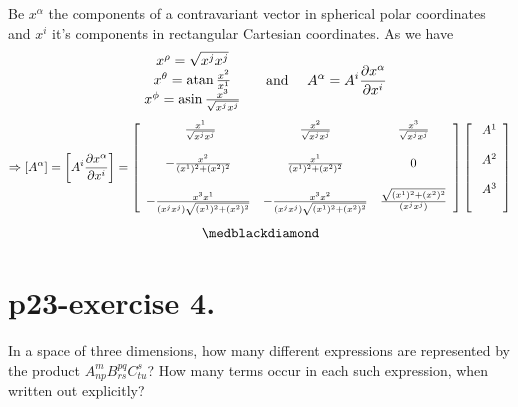 Be $x^{\alpha}$ the components of a contravariant vector in spherical polar coordinates and $x^{i}$ it's components in rectangular Cartesian coordinates. As we have  
\begin{align}
 \begin{array}{c}
    \ x^{\rho} = \sqrt{x^{j}x^{j}}\\
    \ x^{\theta} = \atan{\frac{x^{2}}{x^{1}}}\\
    \ x^{\phi} = \asin{\frac{x^{3}}{\sqrt{{x^{j}x^{j}}}}}\\
  \end{array} \quad \text{ and } \quad A^{\alpha} = A^{i}\pdv{x^{\alpha}}{x^{i}}
  \end{align}
\begin{align}
\Rightarrow \left[A^{\alpha} \right]=  \left[A^{i}\pdv{x^{\alpha}}{x^{i}}\right] = \left[ {\begin{array}{ccc}
    \ \frac{x^1} { \sqrt{x^{j}x^{j}}} & \frac{x^2} { \sqrt{x^{j}x^{j}}} & \frac{x^3} { \sqrt{x^{j}x^{j}}}\\\\
    -\frac{x^2} { (x^1)^2+(x^2)^2} & \frac{x^1} { (x^1)^2+(x^2)^2}  & 0 \\\\
    -\frac{x^3x^1} { (x^{j}x^{j})\sqrt{(x^1)^2+(x^2)^2}} & -\frac{x^3x^2} { (x^{j}x^{j})\sqrt{(x^1)^2+(x^2)^2}}  & \frac{\sqrt{(x^1)^2+(x^2)^2}} { (x^{j}x^{j})} \\
  \end{array} } \right]\left[ {\begin{array}{c}
    \ A^{1}\\\\
    \ A^{2}\\\\
    \ A^{3}\\\\
  \end{array} } \right]
\end{align}
$$\medblackdiamond$$
\pagebreak[4]

\section{p23-exercise 4.}
\begin{tcolorbox}
In a space of three dimensions, how many different expressions are represented by the product $A^{m}_{np} B^{pq}_{rs}C^{s}_{tu}$? How many terms occur in each such expression, when written out explicitly?
\end{tcolorbox}

